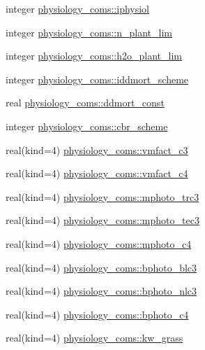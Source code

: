 \begin{DoxyCompactItemize}
\item 
integer \hyperlink{namespacephysiology__coms_ae3ae55cb0b3b3e4ac3fad3829d422940}{physiology\+\_\+coms\+::iphysiol}
\item 
integer \hyperlink{namespacephysiology__coms_ae25a0a523887f680c687728a8b285400}{physiology\+\_\+coms\+::n\+\_\+plant\+\_\+lim}
\item 
integer \hyperlink{namespacephysiology__coms_a9762f60703c45a15a967cb86431ffff3}{physiology\+\_\+coms\+::h2o\+\_\+plant\+\_\+lim}
\item 
integer \hyperlink{namespacephysiology__coms_a2933521a1d1ea3626c77432b305b9f16}{physiology\+\_\+coms\+::iddmort\+\_\+scheme}
\item 
real \hyperlink{namespacephysiology__coms_a4f1ff928c4e75edf5caea5bf68deecf6}{physiology\+\_\+coms\+::ddmort\+\_\+const}
\item 
integer \hyperlink{namespacephysiology__coms_a95059b30f39e01aae14790e04a2bee65}{physiology\+\_\+coms\+::cbr\+\_\+scheme}
\item 
real(kind=4) \hyperlink{namespacephysiology__coms_a07128356874806c751549ba416793e1f}{physiology\+\_\+coms\+::vmfact\+\_\+c3}
\item 
real(kind=4) \hyperlink{namespacephysiology__coms_aee570c0398d070cf6c07ee3146b77c05}{physiology\+\_\+coms\+::vmfact\+\_\+c4}
\item 
real(kind=4) \hyperlink{namespacephysiology__coms_a3dfbe191e81a908c50c593e9a147469a}{physiology\+\_\+coms\+::mphoto\+\_\+trc3}
\item 
real(kind=4) \hyperlink{namespacephysiology__coms_a10f9a3f8b0759641e8f9997d77f01fa8}{physiology\+\_\+coms\+::mphoto\+\_\+tec3}
\item 
real(kind=4) \hyperlink{namespacephysiology__coms_a08c8e567e9ac2f38e5386c00b1069335}{physiology\+\_\+coms\+::mphoto\+\_\+c4}
\item 
real(kind=4) \hyperlink{namespacephysiology__coms_af223ea7d50d62345508e6ab92ee4dafc}{physiology\+\_\+coms\+::bphoto\+\_\+blc3}
\item 
real(kind=4) \hyperlink{namespacephysiology__coms_a08a6a0d248f95a16dd7a7206ec807fd4}{physiology\+\_\+coms\+::bphoto\+\_\+nlc3}
\item 
real(kind=4) \hyperlink{namespacephysiology__coms_a4f00e884edf8cdf98d03e6384afed7f4}{physiology\+\_\+coms\+::bphoto\+\_\+c4}
\item 
real(kind=4) \hyperlink{namespacephysiology__coms_a5851785d443262ca4a05d4a8ba0668c9}{physiology\+\_\+coms\+::kw\+\_\+grass}

\end{DoxyCompactItemize}
